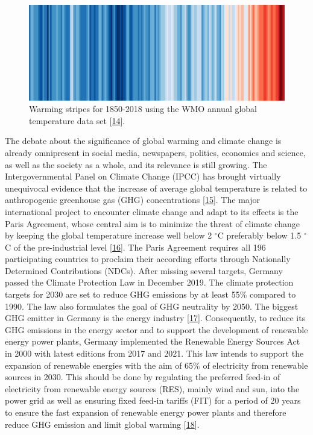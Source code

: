 \documentclass[a4paper,11pt]{article}
\begin{document}
\begin{figure}

{\centering \includegraphics[width=1\linewidth,height=0.07\textheight]{figures/wmo_stripes} 

}

\caption{Warming stripes for 1850-2018 using the WMO annual global temperature data set {[}\protect\hyperlink{ref-EdHawkins.2018}{14}{]}.}\label{fig:wmo}
\end{figure}
The debate about the significance of global warming and climate change is already omnipresent in social media, newspapers, politics, economics and science, as well as the society as a whole, and its relevance is still growing. The Intergovernmental Panel on Climate Change (IPCC) has brought virtually unequivocal evidence that the increase of average global temperature is related to anthropogenic greenhouse gas (GHG) concentrations
{[}\protect\hyperlink{ref-IntergovernmentalPanelonClimateChange.2014}{15}{]}. The major international project to encounter climate change and adapt to its effects is the Paris Agreement, whose central aim is to minimize the threat of climate
change by keeping the global temperature increase well below 2 \(^\circ\)C preferably below 1.5 \(^\circ\)C of the pre-industrial level {[}\protect\hyperlink{ref-UnitedNations.2015}{16}{]}. The Paris Agreement requires all 196 participating countries to proclaim their according efforts through Nationally Determined Contributions (NDCs). After missing several targets, Germany passed the Climate Protection Law in December 2019. The climate protection targets for 2030 are set to reduce GHG emissions by at least 55\% compared to 1990. The law also formulates the goal of GHG neutrality by 2050. The biggest GHG emitter in Germany is the energy industry {[}\protect\hyperlink{ref-Umweltbundesamt.2018}{17}{]}. Consequently, to reduce its GHG emissions in the energy sector and to support the development of renewable energy power plants, Germany implemented the Renewable Energy Sources Act in 2000 with latest editions from 2017 and 2021. This law intends to support the expansion of renewable energies with the aim of 65\% of electricity from renewable sources in 2030. This should be done by regulating the preferred feed-in of electricity from renewable energy sources (RES), mainly wind and sun, into the power grid as well as ensuring fixed feed-in tariffs (FIT) for a period of 20 years to ensure the fast expansion of renewable energy power plants and therefore reduce GHG emission and limit global warming {[}\protect\hyperlink{ref-BundesamtfurJustiz.2021}{18}{]}.
\end{document}
